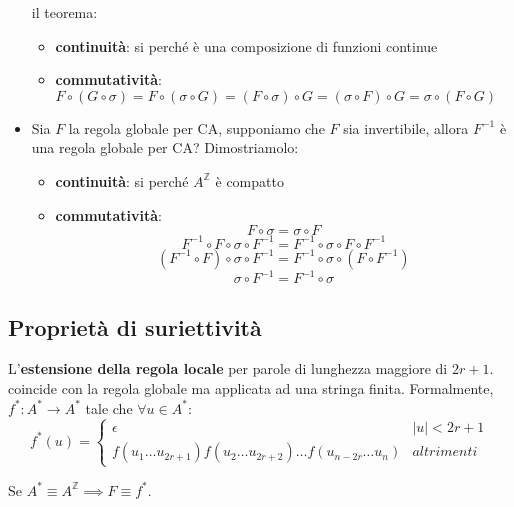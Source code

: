 \begin{itemize}
    il teorema:
    \begin{itemize}
        \item \textbf{continuità}: si perché è una composizione di funzioni continue
        \item \textbf{commutatività}: $F\circ (G\circ \sigma) = F\circ (\sigma\circ G) = (F\circ \sigma)\circ G =(\sigma\circ F)\circ G = \sigma\circ (F\circ G)$
    \end{itemize}
    \item Sia $F$ la regola globale per CA, supponiamo che $F$ sia invertibile, 
    allora $F^{-1}$ è una regola globale per CA? Dimostriamolo:
    \begin{itemize}
        \item \textbf{continuità}: si perché $A^\mathbb{Z}$ è compatto
        \item \textbf{commutatività}: $$F\circ \sigma = \sigma \circ F $$
        $$ F^{-1} \circ F\circ \sigma \circ F^{-1}= F^{-1}\circ \sigma \circ F \circ F^{-1}$$ 
        $$ (F^{-1} \circ F)\circ \sigma \circ F^{-1}= F^{-1}\circ \sigma \circ (F \circ F^{-1})$$
        $$ \sigma \circ F^{-1}= F^{-1}\circ \sigma$$
    \end{itemize}
\end{itemize}

\subsection{Proprietà di suriettività}

\begin{definizione} 
    L'\textbf{estensione della regola locale} per parole di lunghezza maggiore di 
    $2r+1$. coincide con la regola globale ma 
    applicata ad una stringa finita. Formalmente, $f^\ast: A^\ast\rightarrow A^\ast$
    tale che $\forall u\in A^\ast$:
    \begin{equation*}
        f^\ast(u) = \begin{cases}
            \epsilon & |u| < 2r+1\\
            f(u_1\dots u_{2r+1})f(u_2\dots u_{2r+2})\dots f(u_{n-2r}\dots u_{n})& altrimenti
        \end{cases}
    \end{equation*}  
\end{definizione}

\begin{nota}
    Se $A^\ast\equiv A^\mathbb{Z}\implies F \equiv f^\ast$. 
\end{nota}

